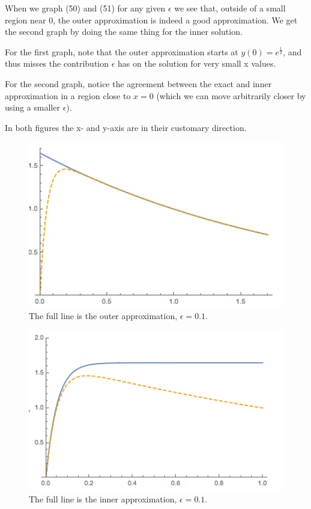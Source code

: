 \documentclass[12pt]{article}
\begin{document}
When we graph (50) and (51) for any given $\epsilon$ we see that,
outside of a small region near 0, the outer approximation is indeed a
good approximation. We get the second graph by doing the same thing
for the inner solution.

For the first graph, note that the outer approximation starts at
$y(0)=e^{\frac{1}{2}}$, and thus misses the contribution $\epsilon$
has on the solution for very small x values.

For the second graph, notice the agreement between the exact and inner
approximation in a region close to $x=0$ (which we can move
arbitrarily closer by using a smaller $\epsilon$).

In both figures the x- and y-axis are in their customary direction.

\newpage
\begin{figure}[ht!]
\centering
\includegraphics[width=120mm]
{tmp_ode-outer.png}
\caption{The full line is the outer approximation, $\epsilon=0.1$.}
\label{overflow}
\end{figure}

\begin{figure}[ht!]
\centering
\includegraphics[width=120mm]
{tmp_ode-inner.png}
\caption{The full line is the inner approximation, $\epsilon=0.1$.}
\label{overflow}
\end{figure}
\end{document}

